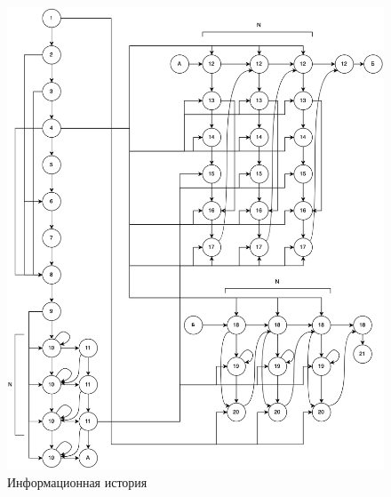\begin{figure}[h!]
	\centering
	\includegraphics[width=0.9\linewidth]{inc/img/ии.png}
	\caption{Информационная история}
	\label{fig:ii}
\end{figure}

\clearpage


